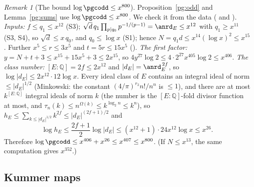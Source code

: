 \documentclass[10pt]{amsart}
\theoremstyle{definition}
\theoremstyle{remark}
\newtheorem{remark}[theorem]{Remark}
\newcommand{\Q}{\mathbb Q}
\begin{document}
\begin{remark}[The bound $\log\pgcodd\le x^{800}$]\label{pod:rem-size}
Proposition~\ref{pg:odd} and Lemma~\ref{pg:sums} use $\log\pgcodd\le x^{800}$. We check it from the
data ({\cite[Lemma~13.4]{P46}} and {\cite[\S14.3]{P46}}). \emph{Inputs:} $f\le q_1\le x^{12}$ (S3);
$\sqrt d\,q_1\prod_{p\mid q_0}p^{-1/(p-1)}=\anrd_E\le x^{12}$ with $q_1\ge x^{11}$ (S3, S4), so
$\sqrt d\le x\,q_0$, and $q_0\le\log x$ (S1); hence $N=q_1d\le x^{14}(\log x)^2\le x^{15}$. Further
$x^5\le r\le3x^5$ and $t=5r\le15x^5$ ({\cite[\S14.3]{P46}}). \emph{The first factor:} $y=N+t+3\le
x^{15}+15x^5+3\le2x^{15}$, so $4y^{27}\log2\le4\cdot2^{27}x^{405}\log2\le x^{406}$. \emph{The class
number:} $[E:\Q]=2f\le2x^{12}$ and $|d_E|=\anrd_E^{\,2f}$, so $\log|d_E|\le2x^{12}\cdot12\log x$.
Every ideal class of $E$ contains an integral ideal of norm $\le|d_E|^{1/2}$ (Minkowski: the
constant $(4/\pi)^{r_2}n!/n^n$ is $\le1$), and there are at most $k^{[E:\Q]}$ integral ideals of norm
$k$ (the number is the $[E:\Q]$-fold divisor function at most, and $\tau_n(k)\le n^{\Omega(k)}\le
k^{\log_2n}\le k^n$), so $h_E\le\sum_{k\le|d_E|^{1/2}}k^{2f}\le|d_E|^{(2f+1)/2}$ and
\[
\log h_E\le\frac{2f+1}2\log|d_E|\le(x^{12}+1)\cdot24x^{12}\log x\le x^{26}.
\]
Therefore $\log\pgcodd\le x^{406}+x^{26}\le x^{407}\le x^{800}$. (If $N\le x^{13}$, the same computation gives $x^{352}$.)
\end{remark}



\providecommand{\auO}{\mathcal O}
\providecommand{\auNm}{\operatorname{Nm}}
\providecommand{\pgG}{G_E}
\providecommand{\pgcyc}{\varepsilon_\ell}
\providecommand{\prilen}{\operatorname{len}}
\providecommand{\prival}{\operatorname{val}}
\providecommand{\prity}{\mathrm{ty}}
\providecommand{\pkuinv}{\operatorname{inv}}
\providecommand{\pkuHom}{\operatorname{Hom}}
\providecommand{\pkuGal}{\operatorname{Gal}}
\providecommand{\pkucp}{\varepsilon^{+}}
\providecommand{\pkuSel}{\operatorname{Sel}^{*}}
\providecommand{\pkuur}{\mathrm{ur}}
\providecommand{\pkuAnn}{\operatorname{Ann}}
\providecommand{\pkured}{\operatorname{red}}

\subsection{Kummer maps}\label{pku:sec}
\end{document}
